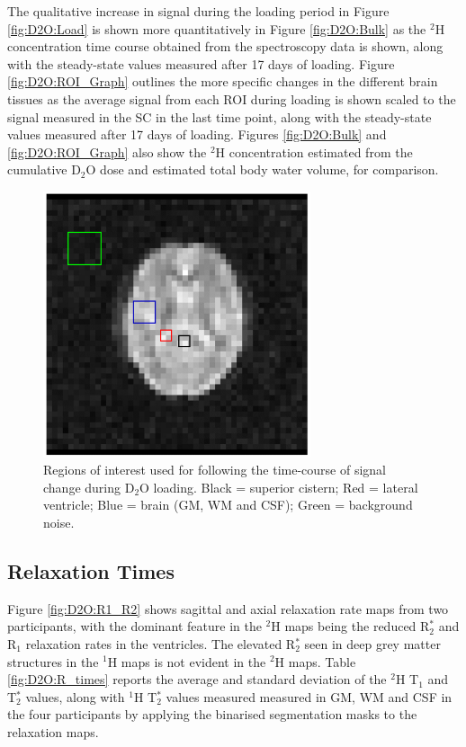 \documentclass[class=article, crop=false]{standalone}
\begin{document}
The qualitative increase in signal during the loading period in Figure \ref{fig:D2O:Load} is shown more quantitatively in Figure \ref{fig:D2O:Bulk} as the $^2$H concentration time course obtained from the spectroscopy data is shown, along with the steady-state values measured after 17 days of loading. Figure \ref{fig:D2O:ROI_Graph} outlines the more specific changes in the different brain tissues as the average signal from each ROI during loading is shown scaled to the signal measured in the SC in the last time point, along with the steady-state values measured after 17 days of loading. Figures \ref{fig:D2O:Bulk} and \ref{fig:D2O:ROI_Graph} also show the $^2$H concentration estimated from the cumulative D$_2$O dose and estimated total body water volume, for comparison. 

\begin{figure}
    \centering
    \includegraphics[width=0.7\textwidth]{Figures/D2O/ROI.png}
    \caption{Regions of interest used for following the time-course of signal change during D$_2$O loading. Black = superior cistern; Red = lateral ventricle; Blue = brain (GM, WM and CSF); Green = background noise.}
    \label{fig:D2O:ROI}
\end{figure}



\subsection{Relaxation Times}

Figure \ref{fig:D2O:R1_R2} shows sagittal and axial relaxation rate maps from two participants, with the dominant feature in the $^2$H maps being the reduced R$_2^*$ and R$_1$ relaxation rates in the ventricles. The elevated R$_2^*$ seen in deep grey matter structures in the $^1$H maps is not evident in the $^2$H maps. Table \ref{fig:D2O:R_times} reports the average and standard deviation of the $^2$H T$_1$ and T$_2^*$ values, along with $^1$H T$_2^*$ values measured measured in GM, WM and CSF in the four participants by applying the binarised segmentation masks to the relaxation maps.
\end{document}
